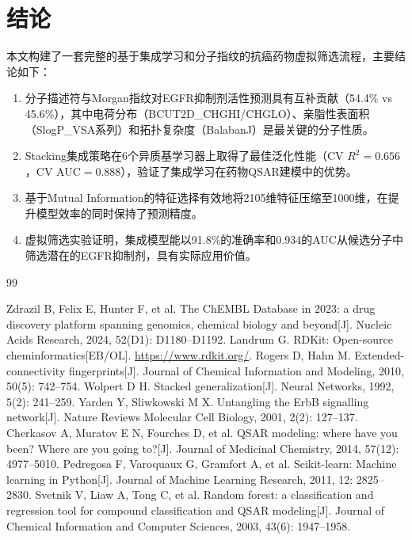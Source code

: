 \documentclass[12pt,a4paper]{article}
\begin{document}
\section{结论}

本文构建了一套完整的基于集成学习和分子指纹的抗癌药物虚拟筛选流程，主要结论如下：

\begin{enumerate}[leftmargin=2em]
    \item 分子描述符与Morgan指纹对EGFR抑制剂活性预测具有互补贡献（54.4\% vs 45.6\%），其中电荷分布（BCUT2D\_CHGHI/CHGLO）、亲脂性表面积（SlogP\_VSA系列）和拓扑复杂度（BalabanJ）是最关键的分子性质。
    \item Stacking集成策略在6个异质基学习器上取得了最佳泛化性能（CV $R^2 = 0.656$，CV AUC$= 0.888$），验证了集成学习在药物QSAR建模中的优势。
    \item 基于Mutual Information的特征选择有效地将2105维特征压缩至1000维，在提升模型效率的同时保持了预测精度。
    \item 虚拟筛选实验证明，集成模型能以91.8\%的准确率和0.934的AUC从候选分子中筛选潜在的EGFR抑制剂，具有实际应用价值。
\end{enumerate}

\begin{thebibliography}{99}
\raggedright
{} Zdrazil B, Felix E, Hunter F, et al. The ChEMBL Database in 2023: a drug discovery platform spanning genomics, chemical biology and beyond[J]. Nucleic Acids Research, 2024, 52(D1): D1180--D1192.
 Landrum G. RDKit: Open-source cheminformatics[EB/OL]. \url{https://www.rdkit.org/}.
 Rogers D, Hahn M. Extended-connectivity fingerprints[J]. Journal of Chemical Information and Modeling, 2010, 50(5): 742--754.
 Wolpert D H. Stacked generalization[J]. Neural Networks, 1992, 5(2): 241--259.
 Yarden Y, Sliwkowski M X. Untangling the ErbB signalling network[J]. Nature Reviews Molecular Cell Biology, 2001, 2(2): 127--137.
 Cherkasov A, Muratov E N, Fourches D, et al. QSAR modeling: where have you been? Where are you going to?[J]. Journal of Medicinal Chemistry, 2014, 57(12): 4977--5010.
 Pedregosa F, Varoquaux G, Gramfort A, et al. Scikit-learn: Machine learning in Python[J]. Journal of Machine Learning Research, 2011, 12: 2825--2830.
 Svetnik V, Liaw A, Tong C, et al. Random forest: a classification and regression tool for compound classification and QSAR modeling[J]. Journal of Chemical Information and Computer Sciences, 2003, 43(6): 1947--1958.
\end{thebibliography}
\end{document}
